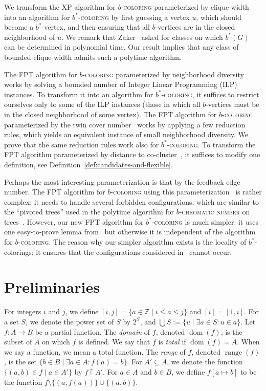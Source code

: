 \documentclass[runningheads, envcountsame]{llncs}
\newcommand{\sep}{\;|\;}
\newcommand{\seq}{\subseteq}
\DeclareMathOperator{\dom}{dom}
\DeclareMathOperator{\range}{range}
\newcommand{\FPT}{\textsf{FPT}\xspace}
\newcommand{\XP}{\textsf{XP}\xspace}
\newcommand{\bscoloring}{$b^*$-\textsc{coloring}\xspace}
\newcommand{\bcoloring}{$b$-\textsc{coloring}\xspace}
\newcommand{\bchromatic}{\textsc{$b$-chromatic number}\xspace}
\begin{document}
We transform the \XP algorithm for \bcoloring parameterized by clique-width~\cite{JaffkeLL24} into an algorithm for \bscoloring by first guessing a vertex $u$, which should become a $b^*$-vertex, and then ensuring that all $b$-vertices are in the closed neighborhood of $u$.
We remark that Zaker~\cite[Problem 3]{ZAKER2025370} asked for classes on which $b^*(G)$ can be determined in polynomial time.
Our result implies that any class of bounded clique-width admits such a polytime algorithm.

The \FPT algorithm for \bcoloring parameterized by neighborhood diversity~\cite{JaffkeLS23} works by solving a bounded number of Integer Linear Programming (ILP) instances. To transform it into an algorithm for \bscoloring, it suffices to restrict ourselves only to some of the ILP instances (those in which all $b$-vertices must be in the closed neighborhood of some vertex).
The \FPT algorithm for \bcoloring parameterized by the twin cover number~\cite{JaffkeLS23} works by applying a few reduction rules, which yields an equivalent instance of small neighborhood diversity.
We prove that the same reduction rules work also for \bscoloring.
To transform the \FPT algorithm parameterized by distance to co-cluster~\cite{DBLP:conf/mfcs/Balaban26}, it suffices to modify one definition, see Definition~\ref{def:candidates-and-flexible}.

Perhaps the most interesting parameterization is that by the feedback edge number.
The \FPT algorithm for \bcoloring using this parameterization~\cite{DBLP:conf/mfcs/Balaban26} is rather complex; it needs to handle several forbidden configurations, which are similar to the ``pivoted trees'' used in the polytime algorithm for \bchromatic on trees~\cite{IRVING1999127}.
However, our new \FPT algorithm for \bscoloring is much simpler: it uses one easy-to-prove lemma from~\cite{DBLP:conf/mfcs/Balaban26} but otherwise it is independent of the algorithm for \bcoloring.
The reason why our simpler algorithm exists is the locality of $b^*$-colorings: it ensures that the configurations considered in~\cite{DBLP:conf/mfcs/Balaban26} cannot occur.
 


 
\section{Preliminaries}\label{sec:prelims}
For integers $i$ and $j$, we define $[i,j] = \{a \in \mathbb Z \sep i \le a \le j\}$ and $[i] = [1, i]$.
For a set $S$, we denote the power set of $S$ by $2^S$, and $\bigcup S := \{u \sep \exists a \in S\colon u\in a\}$.
Let $f\colon A \rightarrow B$ be a partial function.
The \emph{domain} of $f$, denoted $\dom(f)$, is the subset of $A$ on which $f$ is defined.
We say that $f$ is \emph{total} if $\dom(f) = A$.
When we say a function, we mean a total function.
The \emph{range} of $f$, denoted $\range(f)$, is the set $\{b \in B\sep \exists a\in A\colon f(a) = b\}$.
For $A'\seq A$, we denote the function $\{(a, b) \in f \sep a \in A'\}$ by $f \upharpoonright A'$.
For $a \in A$ and $b \in B$, we define $f[a \mapsto b]$ to be the function $f \setminus \{(a, f(a))\} \cup \{(a, b)\}$.
\end{document}
